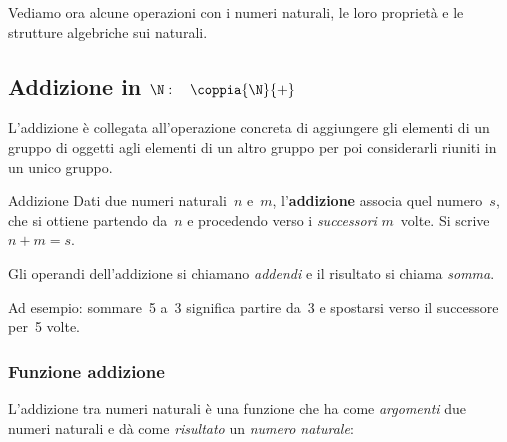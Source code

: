 Vediamo ora alcune operazioni con i numeri naturali, le loro proprietà e le 
strutture algebriche sui naturali.

\subsection{Addizione in 
\texorpdfstring{$\N: \quad \coppia{\N}{+}$}{N: (N; +)}}

L'addizione è collegata all'operazione concreta di aggiungere gli elementi 
di un gruppo di oggetti agli elementi di un altro gruppo per poi 
considerarli riuniti in un unico gruppo.

\begin{definizione}{Addizione}{}
Dati due numeri naturali~\(n\) e~\(m\), l'\textbf{addizione} associa quel 
numero~\(s\), che si ottiene partendo da~\(n\) e procedendo verso i 
\emph{successori} \(m\)~volte. Si scrive~\(n+m=s\).

Gli operandi dell'addizione si chiamano \emph{addendi} e il risultato si 
chiama \emph{somma}.
\end{definizione}

Ad esempio: sommare~5 a~3 significa partire da~3 e spostarsi verso il 
successore per~5 volte.


\vspace{-.5em}
\subsubsection{Funzione addizione}

L'addizione tra numeri naturali è una funzione che ha come \emph{argomenti} 
due numeri naturali e dà come \emph{risultato} un \emph{numero naturale}:

\vspace{.5em}

